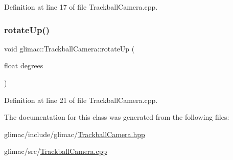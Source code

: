 Definition at line 17 of file Trackball\+Camera.\+cpp.

\mbox{\label{classglimac_1_1_trackball_camera_a7cb7c641caae3d6a1b7a575c7461016c}} 
\subsubsection{\texorpdfstring{rotate\+Up()}{rotateUp()}}
{\footnotesize\ttfamily void glimac\+::\+Trackball\+Camera\+::rotate\+Up (\begin{DoxyParamCaption}\item[{float}]{degrees }\end{DoxyParamCaption})}



Definition at line 21 of file Trackball\+Camera.\+cpp.



The documentation for this class was generated from the following files\+:\begin{DoxyCompactItemize}
\item 
glimac/include/glimac/\hyperlink{_trackball_camera_8hpp}{Trackball\+Camera.\+hpp}\item 
glimac/src/\hyperlink{_trackball_camera_8cpp}{Trackball\+Camera.\+cpp}\end{DoxyCompactItemize}
